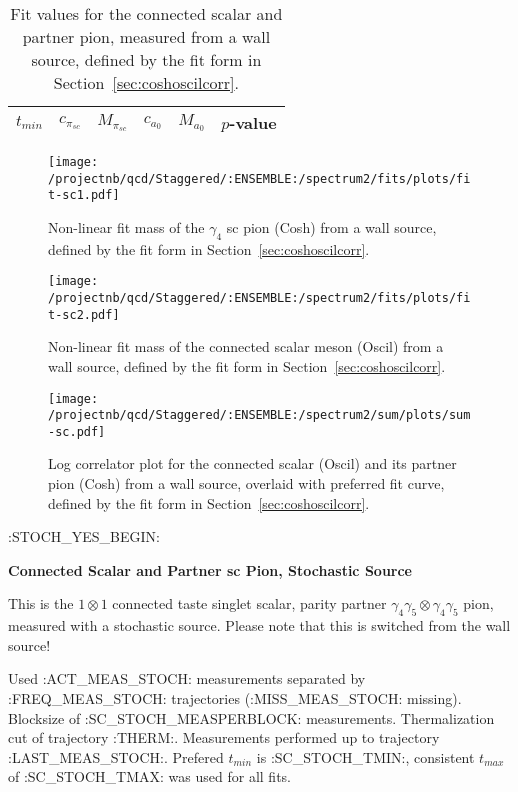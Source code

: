 \begin{table}[ht!]
\centering
\scriptsize
\begin{tabular}{|c|c|c|c|c|c|}
\hline
 $t_{min}$ & $c_{\pi_{sc}}$ &  $M_{\pi_{sc}}$ & $c_{a_0}$ & $M_{a_0}$ & $p$-value \\
\hline

\end{tabular}
\caption{Fit values for the connected scalar and partner pion, measured from a wall source, defined by the fit form in Section~\ref{sec:coshoscilcorr}.}
\end{table}


\begin{multicols}{2}
\begin{figure}[H]
\centering
\texttt{[image: /projectnb/qcd/Staggered/:ENSEMBLE:/spectrum2/fits/plots/fit-sc1.pdf]}
\caption{Non-linear fit mass of the $\gamma_4$ sc pion (Cosh) from a wall source, defined by the fit form in Section~\ref{sec:coshoscilcorr}.}
\end{figure}
\columnbreak
\begin{figure}[H]
\centering
\texttt{[image: /projectnb/qcd/Staggered/:ENSEMBLE:/spectrum2/fits/plots/fit-sc2.pdf]}
\caption{Non-linear fit mass of the connected scalar meson (Oscil) from a wall source, defined by the fit form in Section~\ref{sec:coshoscilcorr}.}
\end{figure}
\end{multicols}

\begin{figure}[H]
\centering
\texttt{[image: /projectnb/qcd/Staggered/:ENSEMBLE:/spectrum2/sum/plots/sum-sc.pdf]}
\caption{Log correlator plot for the connected scalar (Oscil) and its partner pion (Cosh) from a wall source, overlaid with preferred fit curve, defined by the fit form in Section~\ref{sec:coshoscilcorr}.}
\end{figure}

\clearpage

:STOCH_YES_BEGIN:
\centerline{\textbf{Connected Scalar and Partner sc Pion, Stochastic Source}}

This is the $1 \otimes 1$ connected taste singlet scalar, parity partner $\gamma_4 \gamma_5 \otimes \gamma_4 \gamma_5$ pion, measured with a stochastic source. Please note that this is switched from the wall source!

{\small{Used :ACT_MEAS_STOCH: measurements separated by :FREQ_MEAS_STOCH: trajectories (:MISS_MEAS_STOCH: missing). Blocksize of :SC_STOCH_MEASPERBLOCK: measurements. Thermalization cut of trajectory :THERM:. Measurements performed up to trajectory :LAST_MEAS_STOCH:. Prefered $t_{min}$ is :SC_STOCH_TMIN:, consistent $t_{max}$ of :SC_STOCH_TMAX: was used for all fits.}}

